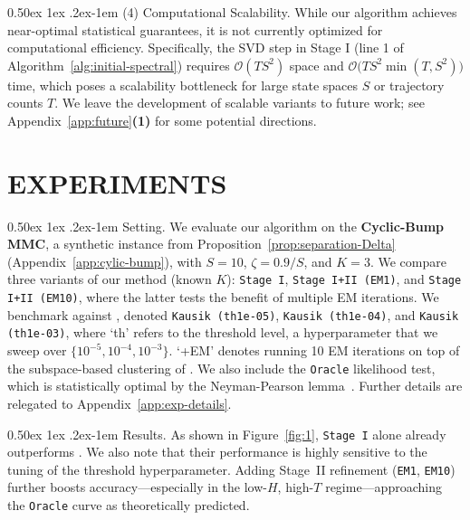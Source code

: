 \documentclass[twoside]{article}
\makeatletter
\renewcommand{\paragraph}{%
  \@startsection{paragraph}{4}%
  {\z@}{0.50ex \@plus 1ex \@minus .2ex}{-1em}%
  {\normalfont\normalsize\bfseries}%
}
\def\gO{{\mathcal{O}}}
\theoremstyle{plain}
\makeatother
\begin{document}
\paragraph{(4) Computational Scalability.}
While our algorithm achieves near-optimal statistical guarantees, it is not currently optimized for computational efficiency.
Specifically, the SVD step in Stage I (line 1 of Algorithm~\ref{alg:initial-spectral}) requires $\gO(T S^2)$ space and $\gO\big(T S^2 \min(T, S^2)\big)$ time, which poses a scalability bottleneck for large state spaces $S$ or trajectory counts $T$.
We leave the development of scalable variants to future work; see Appendix~\ref{app:future}\textbf{(1)} for some potential directions.







\section{EXPERIMENTS}
\label{sec:experiments}
\paragraph{Setting.}
We evaluate our algorithm on the \textbf{Cyclic-Bump MMC}, a synthetic instance from Proposition~\ref{prop:separation-Delta} (Appendix~\ref{app:cylic-bump}), with $S = 10$, $\zeta = 0.9 / S$, and $K = 3$.
We compare three variants of our method (known $K$): \texttt{\color{OursStage1}Stage I}, \texttt{\color{OursEM1}Stage I+II (EM1)}, and \texttt{\color{OursEM10}Stage I+II (EM10)}, where the latter tests the benefit of multiple EM iterations.
We benchmark against \citet{kausik2023mixture}, denoted \texttt{\color{KausikP10}Kausik (th1e-05)}, \texttt{\color{KausikP30}Kausik (th1e-04)}, and \texttt{\color{KausikP50}Kausik (th1e-03)}, where `th' refers to the threshold level, a hyperparameter that we sweep over $\{10^{-5}, 10^{-4}, 10^{-3}\}$.
`+EM' denotes running 10 EM iterations on top of the subspace-based clustering of \citet{kausik2023mixture}.
We also include the \texttt{\color{Oracle}Oracle} likelihood test, which is statistically optimal by the Neyman-Pearson lemma~\citep{neyman-pearson}.
Further details are relegated to Appendix~\ref{app:exp-details}.

\paragraph{Results.}
As shown in Figure~\ref{fig:1}, \texttt{\color{OursStage1}Stage I} alone already outperforms \citet{kausik2023mixture}.
We also note that their performance is highly sensitive to the tuning of the threshold hyperparameter.
Adding Stage~II refinement (\texttt{\color{OursEM1}EM1}, \texttt{\color{OursEM10}EM10}) further boosts accuracy---especially in the low-$H$, high-$T$ regime---approaching the \texttt{\color{Oracle}Oracle} curve as theoretically predicted.
\end{document}
